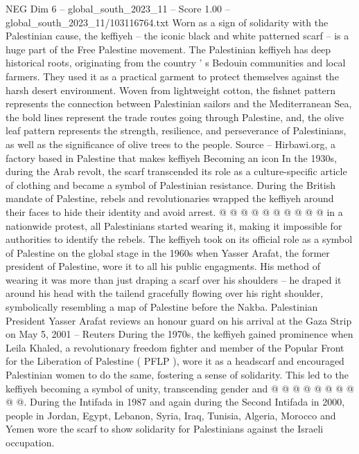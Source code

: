 \begin{textsample}{NEG Dim 6 – global\_south\_2023\_11 – Score 1.00 – global\_south\_2023\_11/103116764.txt}  \label{ex:f6_neg_193}
Worn as a sign of solidarity with the Palestinian cause, the keffiyeh -- the iconic black and white patterned scarf -- is a huge part of the Free Palestine movement.
The Palestinian keffiyeh has deep historical roots, originating from the country ' s Bedouin communities and local farmers.
They used it as a practical garment to protect themselves against the harsh desert environment.
Woven from lightweight cotton, the fishnet pattern represents the connection between Palestinian sailors and the Mediterranean Sea, the bold lines represent the trade routes going through Palestine, and, the olive leaf pattern represents the strength, resilience, and perseverance of Palestinians, as well as the significance of olive trees to the people.
Source -- Hirbawi.org, a factory based in Palestine that makes keffiyeh Becoming an icon In the 1930s, during the Arab revolt, the scarf transcended its role as a culture-specific article of clothing and became a symbol of Palestinian resistance.
During the British mandate of Palestine, rebels and revolutionaries wrapped the keffiyeh around their faces to hide their identity and avoid arrest. @ @ @ @ @ @ @ @ @ @ in a nationwide protest, all Palestinians started wearing it, making it impossible for authorities to identify the rebels.
The keffiyeh took on its official role as a symbol of Palestine on the global stage in the 1960s when Yasser Arafat, the former president of Palestine, wore it to all his public engagments.
His method of wearing it was more than just draping a scarf over his shoulders -- he draped it around his head with the tailend gracefully flowing over his right shoulder, symbolically resembling a map of Palestine before the Nakba.
Palestinian President Yasser Arafat reviews an honour guard on his arrival at the Gaza Strip on May 5, 2001 -- Reuters During the 1970s, the keffiyeh gained prominence when Leila Khaled, a revolutionary freedom fighter and member of the Popular Front for the Liberation of Palestine ( PFLP ), wore it as a headscarf and encouraged Palestinian women to do the same, fostering a sense of solidarity.
This led to the keffiyeh becoming a symbol of unity, transcending gender and @ @ @ @ @ @ @ @ @ @.
During the Intifada in 1987 and again during the Second Intifada in 2000, people in Jordan, Egypt, Lebanon, Syria, Iraq, Tunisia, Algeria, Morocco and Yemen wore the scarf to show solidarity for Palestinians against the Israeli occupation.

\end{textsample}

